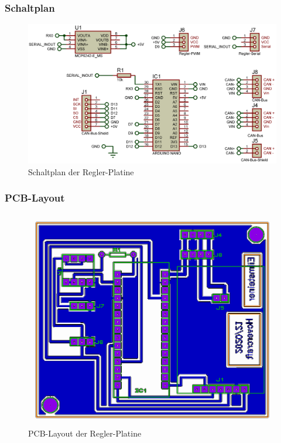 \subsubsection{Schaltplan}
\begin{figure}[h]
    \centering
    \includegraphics[width=1.0\textwidth]{../Proteus/Exports/Regler-Platine.png}    
    \caption{Schaltplan der Regler-Platine\label{fig:plat:regler}}
\end{figure}

\newpage

\subsubsection{PCB-Layout}
\begin{figure}[h]
    \centering
    \includegraphics[width=1.0\textwidth]{../Proteus/Exports/Regler_Platine_PCB.png}    
    \caption{PCB-Layout der Regler-Platine}
\end{figure}

